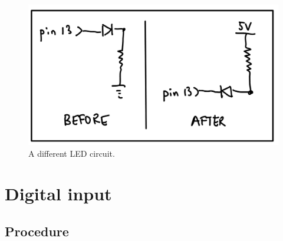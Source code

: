 \documentclass[11pt]{article} %
\begin{document}
\begin{enumerate}
\begin{figure}[htbp]
\begin{center}
\includegraphics{figures/led_reversed}
\caption{A different LED circuit.}
\label{fig:led.reverse}
\end{center}
\end{figure}

\end{enumerate}

\section*{Digital input}
\label{sec:digital.in}
\subsection*{Procedure}
\end{document}
